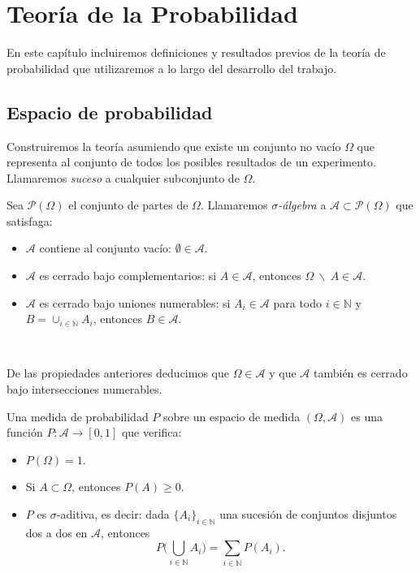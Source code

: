 \documentclass[oneside,openright,titlepage,numbers=noenddot,openany,headinclude,footinclude=true,
cleardoublepage=empty,abstractoff,BCOR=5mm,paper=a4,fontsize=12pt,main=spanish]{scrreprt}
\begin{document}
\chapter{Teoría de la Probabilidad}

En este capítulo incluiremos definiciones y resultados previos de la teoría de probabilidad que utilizaremos a lo largo del desarrollo del trabajo.

\section{Espacio de probabilidad}

Construiremos la teoría asumiendo que existe un conjunto no vacío $\Omega$ que representa al conjunto de todos los posibles resultados de un experimento. Llamaremos \textit{suceso} a cualquier subconjunto de $\Omega$.\\

\begin{definition}
Sea $\mathcal{P}(\Omega)$ el conjunto de partes de $\Omega$. Llamaremos \textit{$\sigma$-álgebra} a $\mathcal{A} \subset \mathcal{P}(\Omega)$ que satisfaga:

\begin{itemize}
\item $\mathcal{A}$ contiene al conjunto vacío: $\emptyset \in \mathcal{A}$.
\item $\mathcal{A}$ es cerrado bajo complementarios: si $A \in \mathcal{A}$, entonces $\Omega\ \backslash\ A \in \mathcal{A}$.
\item $\mathcal{A}$ es cerrado bajo uniones numerables: si $A_i \in \mathcal{A}$ para todo $i \in \mathbb{N}$ y $B=\cup_{i\in \mathbb{N}}A_i$, entonces $B \in \mathcal{A}$.
\end{itemize}
\end{definition}\

De las propiedades anteriores deducimos que $\Omega \in \mathcal{A}$ y que $\mathcal{A}$ también es cerrado bajo intersecciones numerables.\\

\begin{definition} Una medida de probabilidad $P$ sobre un espacio de medida $(\Omega, \mathcal{A})$ es una función $P\colon \mathcal{A} \to [0,1]$ que verifica:

\begin{itemize}
    \item $P(\Omega) = 1$.
    \item Si $A \subset \Omega$, entonces $P(A) \geq 0$.
    \item $P$ es $\sigma$-aditiva, es decir: dada $\{A_i\}_{i\in \mathbb{N}}$ una sucesión de conjuntos disjuntos dos a dos en $\mathcal{A}$, entonces
  \[
  P\Big(\bigcup_{i\in \mathbb{N}}A_i \Big) = \sum_{i \in \mathbb{N}}P(A_i).
  \]
\end{itemize}
\end{definition}\
\end{document}
